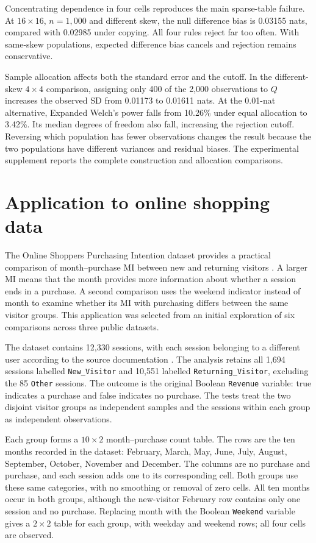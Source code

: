 Concentrating dependence in four cells reproduces the main sparse-table
failure. At \(16\times16\), \(n=1{,}000\) and different skew, the
null difference bias is 0.03155 nats, compared with 0.02985 under copying.
All four rules reject far too often. With same-skew populations, expected
difference bias cancels and rejection remains conservative.

Sample allocation affects both the standard error and the cutoff. In
the different-skew \(4\times4\) comparison, assigning only 400 of the
2,000 observations to \(Q\) increases the observed SD from 0.01173 to
0.01611 nats. At the 0.01-nat alternative, Expanded Welch's power falls
from 10.26\% under equal allocation to 3.42\%. Its median degrees of
freedom also fall, increasing the rejection cutoff. Reversing which
population has fewer observations changes the result because the two
populations have different variances and residual biases.
The experimental supplement reports the complete construction and
allocation comparisons.

\section{Application to online shopping data}
\label{sec:shoppers-application}

The Online Shoppers Purchasing Intention dataset provides a practical
comparison of month--purchase MI between new and returning visitors
\citep{sakar2018}.
A larger MI means that the month provides more information about whether
a session ends in a purchase. A second comparison uses the weekend
indicator instead of month to examine whether its MI with purchasing
differs between the same visitor groups. This application was selected
from an initial exploration of six comparisons across three public datasets.

The dataset contains 12,330 sessions, with each session belonging to a
different user according to the source documentation \citep{sakar2018}.
The analysis retains all 1,694 sessions labelled \texttt{New\_Visitor}
and 10,551 labelled \texttt{Returning\_Visitor}, excluding the 85
\texttt{Other} sessions. The outcome is the original Boolean
\texttt{Revenue} variable: true indicates a purchase and false indicates
no purchase. The tests treat the two disjoint visitor groups as independent
samples and the sessions within each group as independent observations.

Each group forms a \(10\times2\) month--purchase count table. The rows
are the ten months recorded in the dataset: February, March, May, June,
July, August, September, October, November and December. The columns
are no purchase and purchase, and each session adds one to its corresponding
cell. Both groups use these same categories, with no smoothing or removal
of zero cells. All ten months occur in both groups, although the new-visitor
February row contains only one session and no purchase. Replacing month
with the Boolean \texttt{Weekend} variable gives a \(2\times2\) table
for each group, with weekday and weekend rows; all four cells are observed.

